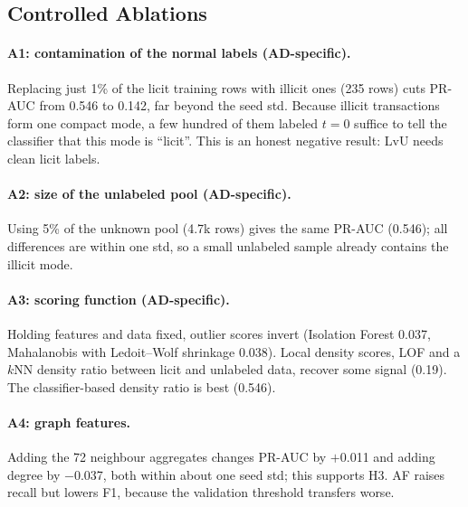 \documentclass[11pt]{article}
\newcommand{\ours}{LvU}
\begin{document}
\subsection{Controlled Ablations}
\label{sec:ablation}

\begin{table}[t]
\centering\small
\setlength{\tabcolsep}{3pt}

\caption{Ablations of \ours{} on the test split, one factor at a time (5 seeds unless deterministic; F1: mean). $\Delta$ = PR-AUC change vs.\ the full method.}
\label{tab:ablation}
\end{table}

\paragraph{A1: contamination of the normal labels (AD-specific).}
Replacing just 1\% of the licit training rows with illicit ones (235 rows) cuts PR-AUC from 0.546 to 0.142, far beyond the seed std.
Because illicit transactions form one compact mode, a few hundred of them labeled $t=0$ suffice to tell the classifier that this mode is ``licit''.
This is an honest negative result: \ours{} needs clean licit labels.

\paragraph{A2: size of the unlabeled pool (AD-specific).}
Using 5\% of the unknown pool (4.7k rows) gives the same PR-AUC (0.546); all differences are within one std, so a small unlabeled sample already contains the illicit mode.

\paragraph{A3: scoring function (AD-specific).}
Holding features and data fixed, outlier scores invert (Isolation Forest 0.037, Mahalanobis with Ledoit--Wolf shrinkage \citep{ledoit2004shrinkage} 0.038).
Local density scores, LOF \citep{breunig2000lof} and a $k$NN density ratio between licit and unlabeled data, recover some signal (0.19).
The classifier-based density ratio is best (0.546).

\paragraph{A4: graph features.}
Adding the 72 neighbour aggregates changes PR-AUC by $+$0.011 and adding degree by $-$0.037, both within about one seed std; this supports H3.
AF raises recall but lowers F1, because the validation threshold transfers worse.
\end{document}
